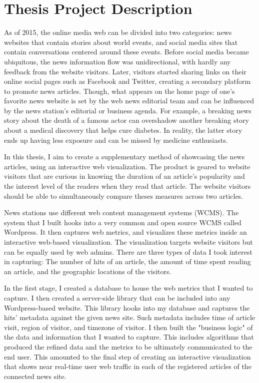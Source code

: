 \documentclass[12pt]{article}
\begin{document}
\begin{singlespace}
\tableofcontents
\end{singlespace}

\vfill

\section{Thesis Project Description}
As of 2015, the online media web can be divided into two categories: news websites that contain stories about world events, and social media sites that contain conversations centered around these events. Before social media became ubiquitous, the news information flow was unidirectional, with hardly any feedback from the website visitors. Later, visitors started sharing links on their online social pages such as Facebook and Twitter, creating a secondary platform to promote news articles. Though, what appears on the home page of one's favorite news website is set by the web news editorial team and can be influenced by the news station's editorial or business agenda. For example, a breaking news story about the death of a famous actor can overshadow another breaking story about a medical discovery that helps cure diabetes. In reality, the latter story ends up having less exposure and can be missed by medicine enthusiasts.  

In this thesis, I aim to create a supplementary method of showcasing the news articles, using an interactive web visualization. The product is geared to website visitors that are curious in knowing the duration of an article's popularity and the interest level of the readers when they read that article. The website visitors should be able to simultaneously compare theses measures across two articles. 

News stations use different web content management systems (WCMS). The system that I built hooks into a very common and open source WCMS called Wordpress. It then captures web metrics, and visualizes these metrics inside an interactive web-based visualization. The visualization targets website visitors but can be equally used by web admins. There are three types of data I took interest in capturing: The number of hits of an article, the amount of time spent reading an article, and the geographic locations of the visitors. 

In the first stage, I created a database to house the web metrics that I wanted to capture. I then created a server-side library that can be included into any Wordpress-based website. This library hooks into my database and captures the hits' metadata against the given news site. Such metadata includes time of article visit, region of visitor, and timezone of visitor.  
I then built the "business logic" of the data and information that I wanted to capture. This includes algorithms that produced the refined data and the metrics to be ultimately communicated to the end user.
This amounted to the final step of creating an interactive visualization that shows near real-time user web traffic in each of the registered articles of the connected news site.
\end{document}
